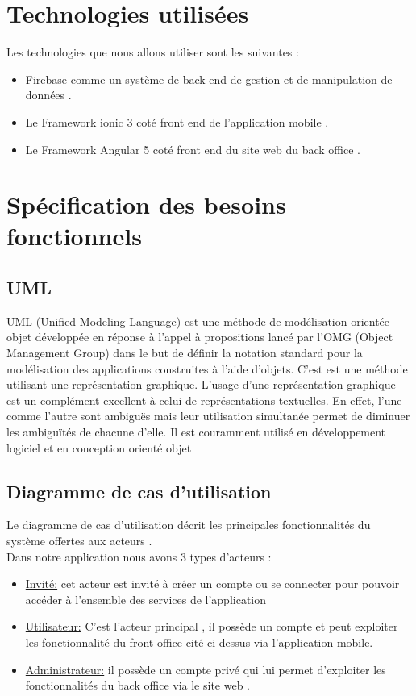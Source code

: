 \documentclass[11pt,a4paper,oneside]{book}
\begin{document}
\begin{center}
\begin{tabular}{ |p{2cm}|p{4cm}|p{4.4cm}|p{4.4cm}|  }
		\end{tabular}
	\end{center}
	
	\section{Technologies utilisées }
	Les technologies que nous allons utiliser sont les suivantes : 
	\begin{itemize}
		\item Firebase comme un système de back end de gestion et de manipulation de données .
		\item Le Framework ionic 3 coté front end de l’application mobile .
		\item Le Framework Angular 5 coté front end du site web du back office .
	\end{itemize}
	\section{Spécification des besoins fonctionnels }	
	\subsection{UML}
	UML (Unified Modeling Language) est une méthode de modélisation orientée objet développée en réponse à l’appel à propositions lancé par l’OMG (Object Management Group) dans le but de définir la notation standard pour la modélisation des applications construites à l’aide d’objets.
	C’est est une méthode utilisant une représentation graphique. L’usage d’une représentation graphique est un complément excellent à celui de représentations textuelles. 
	En effet, l’une comme l’autre sont ambiguës mais leur utilisation simultanée permet de diminuer les ambiguïtés de chacune d’elle. Il est couramment utilisé en développement logiciel et en conception orienté objet
	
	\subsection{Diagramme de cas d’utilisation}
	Le diagramme de cas d’utilisation décrit les principales fonctionnalités du système offertes aux acteurs .\\
	Dans notre application nous avons 3 types d’acteurs : 
	
	\begin{itemize}
		\item \underline{Invité:} cet acteur est invité à créer un compte ou se connecter pour pouvoir accéder à l’ensemble des services de l’application 
		\item \underline{Utilisateur:}  C’est l’acteur principal , il possède un compte et peut exploiter les fonctionnalité du front office cité ci dessus via l’application mobile.
		\item  \underline{Administrateur:} il possède un compte privé qui lui permet d’exploiter les fonctionnalités du back office via le site web .
	\end{itemize}
\end{document}
